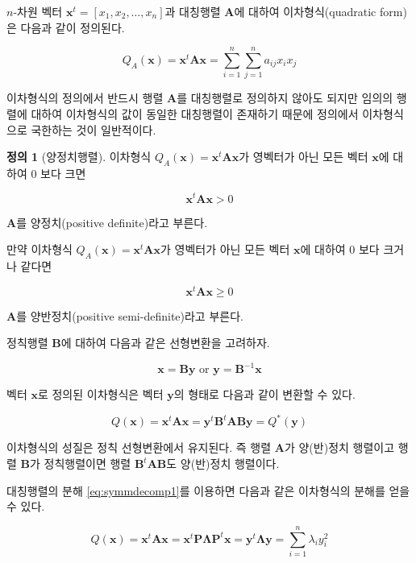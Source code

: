 \documentclass[
]{book}
\theoremstyle{definition}
\newtheorem{definition}{정의}[chapter]
\theoremstyle{definition}
\theoremstyle{definition}
\theoremstyle{remark}
\begin{document}
\(n\)-차원 벡터 \(\bm x^t=[x_1,x_2,\dots,x_n]\)과 대칭행렬 \(\bm A\)에 대하여 이차형식(quadratic form)은 다음과 같이 정의된다.

\begin{equation}
Q_A(\bm x) = \bm x^t \bm A \bm x =\sum_{i=1}^n \sum_{j=1}^n a_{ij} x_i x_j 
\label{eq:quadratic}
\end{equation}

이차형식의 정의에서 반드시 행렬 \(\bm A\)를 대칭행렬로 정의하지 않아도 되지만 임의의 행렬에 대하여 이차형식의 값이 동일한 대칭행렬이 존재하기 때문에 정의에서 이차형식으로 국한하는 것이 일반적이다.

\begin{definition}[양정치행렬]
\protect\hypertarget{def:unnamed-chunk-17}{}{\label{def:unnamed-chunk-17} {} }
이차형식 \(Q_A(\bm x) = \bm x^t \bm A \bm x\)가 영벡터가 아닌 모든 벡터 \(\bm x\)에 대하여 0 보다 크면

\[ \bm x^t \bm A \bm x  >0 \]

\(\bm A\)를 양정치(positive definite)라고 부른다.

만약 이차형식 \(Q_A(\bm x) = \bm x^t \bm A \bm x\)가 영벡터가 아닌 모든 벡터 \(\bm x\)에 대하여 0 보다 크거나 같다면

\[ \bm x^t \bm A \bm x  \ge 0 \]

\(\bm A\)를 양반정치(positive semi-definite)라고 부른다.
\end{definition}

정칙행렬 \(\bm B\)에 대하여 다음과 같은 선형변환을 고려하자.

\[   \bm x = \bm B \bm y \text{ or } \bm y = \bm {B}^{-1} \bm x \]

벡터 \(\bm x\)로 정의된 이차형식은 벡터 \(\bm y\)의 형태로 다음과 같이 변환할 수 있다.

\[ Q(\bm x) = \bm x^t \bm A \bm x = \bm y^t \bm B^t \bm A \bm B \bm y =Q^*(\bm y) \]

이차형식의 성질은 정칙 선형변환에서 유지된다. 즉 행렬 \(\bm A\)가 양(반)정치 행렬이고 행렬 \(\bm B\)가 정칙행렬이면 행렬 \(\bm B^t \bm A \bm B\)도 양(반)정치 행렬이다.

대칭행렬의 분해 \eqref{eq:symmdecomp1}를 이용하면 다음과 같은 이차형식의 분해를 얻을 수 있다.

\begin{equation}
Q(\bm x) = \bm x^t \bm A \bm x = \bm x^t \bm P \bm \Lambda \bm P^t \bm x = \bm y^t \bm \Lambda \bm y= \sum_{i=1}^n \lambda_i y_i^2 
\label{eq:quaddecomp}
\end{equation}
\end{document}
